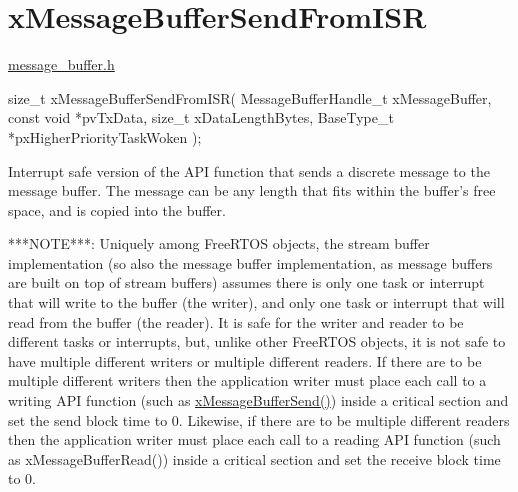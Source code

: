 \hypertarget{group__x_message_buffer_send_from_i_s_r}{}\section{x\+Message\+Buffer\+Send\+From\+I\+SR}
\label{group__x_message_buffer_send_from_i_s_r}
\mbox{\hyperlink{message__buffer_8h}{message\+\_\+buffer.\+h}}


\begin{DoxyPre}
size\_t xMessageBufferSendFromISR( MessageBufferHandle\_t xMessageBuffer,
                                  const void *pvTxData,
                                  size\_t xDataLengthBytes,
                                  BaseType\_t *pxHigherPriorityTaskWoken );

\begin{DoxyPre}\end{DoxyPre}
\end{DoxyPre}



\begin{DoxyPre}
\begin{DoxyPre}   Interrupt safe version of the API function that sends a discrete message to
   the message buffer.  The message can be any length that fits within the
   buffer's free space, and is copied into the buffer.\end{DoxyPre}
\end{DoxyPre}



\begin{DoxyPre}
\begin{DoxyPre}   ***NOTE***:  Uniquely among FreeRTOS objects, the stream buffer
   implementation (so also the message buffer implementation, as message buffers
   are built on top of stream buffers) assumes there is only one task or
   interrupt that will write to the buffer (the writer), and only one task or
   interrupt that will read from the buffer (the reader).  It is safe for the
   writer and reader to be different tasks or interrupts, but, unlike other
   FreeRTOS objects, it is not safe to have multiple different writers or
   multiple different readers.  If there are to be multiple different writers
   then the application writer must place each call to a writing API function
   (such as \mbox{\hyperlink{message__buffer_8h_a858f6da6fe24a226c45caf1634ea1605}{xMessageBufferSend()}}) inside a critical section and set the send
   block time to 0.  Likewise, if there are to be multiple different readers
   then the application writer must place each call to a reading API function
   (such as xMessageBufferRead()) inside a critical section and set the receive
   block time to 0.\end{DoxyPre}
\end{DoxyPre}



